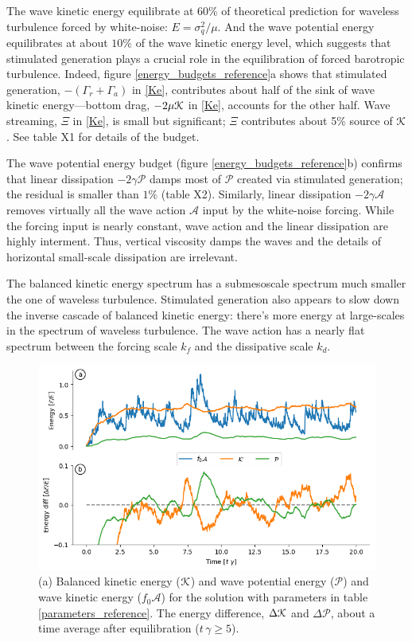 \documentclass[12pt]{article}
\renewcommand{\P}{\mathcal{P}}
\newcommand{\Ewn}{E}
\newcommand{\A}{  \mathcal{A}}
\begin{document}
The wave kinetic energy equilibrate at 60\% of theoretical prediction for waveless
turbulence forced by white-noise: $\Ewn = \sigma_q^2/\mu$. And the wave potential
energy equilibrates at about $10\%$ of the wave kinetic energy level, which suggests
that stimulated generation plays a crucial role in the equilibration of forced
barotropic turbulence.  Indeed, figure \ref{energy_budgets_reference}a shows that
stimulated generation, $-(\Gamma_r+\Gamma_a)$ in \eqref{Ke}, contributes about half
of the sink of wave kinetic energy---bottom drag,
$-2\mu \mathcal{K}$ in  \eqref{Ke}, accounts for the other half. Wave streaming, $\Xi$ in
\eqref{Ke}, is small but significant; $\Xi$ contributes about 5\% source of $\mathcal{K}$.
See table X1 for details of the budget.

The wave potential energy budget (figure \ref{energy_budgets_reference}b) confirms that
linear dissipation $-2\gamma \P$ damps most of $\P$ created via stimulated generation;
the residual is smaller than $1\%$ (table X2). Similarly, linear dissipation
$-2\gamma \A$ removes virtually all the wave action
$\A$ input by the white-noise forcing. While the forcing input is nearly constant,
wave action and the linear dissipation are highly interment. Thus, vertical viscosity damps the waves
and the details of horizontal small-scale dissipation are irrelevant.

The balanced kinetic energy spectrum has a submesoscale spectrum much smaller the
one of waveless turbulence. Stimulated generation also appears to slow down the
inverse cascade of balanced kinetic energy: there's more energy at large-scales
in the spectrum of waveless turbulence. The wave action has a nearly flat spectrum
between the forcing scale $k_f$ and the dissipative scale $k_d$.

\begin{figure}
\centering
\includegraphics[width=.825\textwidth]{figs/energies_reference.png}
\caption{(a) Balanced kinetic energy ($\mathcal{K}$) and wave potential energy ($\P$) and wave
         kinetic energy ($f_0 \A$)  for the solution with parameters in table
         \ref{parameters_reference}. The energy difference, $\Delta \mathcal{K}$ and $\Delta \P$,
         about a time average after equilibration ($t\,\gamma \ge 5$).}
        \label{energies_reference}
\end{figure}
\end{document}
